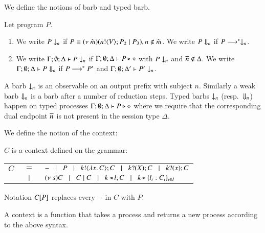 We define the notions of barb and typed barb.

\begin{definition}[Barbs]\rm
	Let program $P$.
	\begin{enumerate}
		\item	We write $P \downarrow_{n}$ if $P \equiv (\nu\ \tilde{m})(n ! \langle V \rangle ; P_2 \;|\; P_3), n \notin \tilde{m}$.
			We write $P \Downarrow_{n}$ if $P \longrightarrow^* \downarrow_{n}$.

		\item	We write $\Gamma; \emptyset; \Delta \vdash P \downarrow_{n}$ if
			$\Gamma; \emptyset; \Delta \vdash P \triangleright \diamond$ with $P \downarrow_{n}$ and $\overline{n} \notin \Delta$.
			We write $\Gamma; \emptyset; \Delta \vdash P \Downarrow_{n}$ if $P \longrightarrow^* P'$ and
			$\Gamma; \emptyset; \Delta' \vdash P' \downarrow_{n}$.			
	\end{enumerate}
\end{definition}

A barb $\downarrow_{n}$ is an observable on an output prefix with subject $n$.
Similarly a weak barb $\Downarrow_{n}$ is a barb after a number of reduction steps.
Typed barbs $\downarrow_{n}$ (resp.\ $\Downarrow_{n}$)
happen on typed processes $\Gamma; \emptyset; \Delta \vdash P \triangleright \diamond$
where we require that the corresponding dual endpoint $\overline{n}$ is not present
in the session type $\Delta$.

We define the notion of the context:

\begin{definition}[Context]\rm
	$C$ is a context defined on the grammar:

	\begin{tabular}{rcl}
		$C$ &$=$& %
		$- \;\;\;|\;\;\; P \;\;\;|\;\;\; k ! \langle \lambda x.\,C \rangle ; C \;\;\;|\;\;\; k ? (X) ; C \;\;\;|\;\;\; k ? (x) ; C$ \\
		& $\;\;\;|\;\;\;$ & $(\nu\ s) C \;\;\;|\;\;\; C \;|\; C \;\;\;|\;\;\; k \triangleleft l ; C \;\;\;|\;\;\; k \triangleright \{l_i:C_i\}_{i \in I}$
	\end{tabular}

	Notation $C[P]$ replaces every $-$ in $C$ with $P$.
\end{definition}

A context is a function that takes a process and returns a new process
according to the above syntax.


